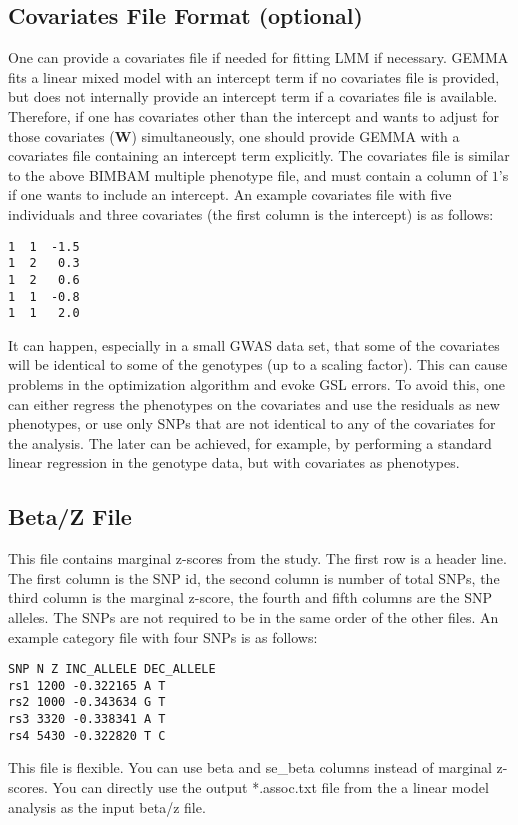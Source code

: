 \documentclass[11pt]{article}
\begin{document}
\subsection{Covariates File Format (optional)}

One can provide a covariates file if needed for fitting LMM if
necessary. GEMMA fits a linear mixed model with an intercept term if
no covariates file is provided, but does not internally provide an
intercept term if a covariates file is available. Therefore, if one
has covariates other than the intercept and wants to adjust for those
covariates ($\mathbf W$) simultaneously, one should provide GEMMA with
a covariates file containing an intercept term explicitly. The
covariates file is similar to the above BIMBAM multiple phenotype
file, and must contain a column of $1$'s if one wants to include an
intercept. An example covariates file with five individuals and three
covariates (the first column is the intercept) is as follows:
%
\begin{verbatim}
1  1  -1.5
1  2   0.3
1  2   0.6
1  1  -0.8
1  1   2.0
\end{verbatim}
%
It can happen, especially in a small GWAS data set, that some of the
covariates will be identical to some of the genotypes (up to a scaling
factor). This can cause problems in the optimization algorithm and
evoke GSL errors. To avoid this, one can either regress the phenotypes
on the covariates and use the residuals as new phenotypes, or use only
SNPs that are not identical to any of the covariates for the
analysis. The later can be achieved, for example, by performing a
standard linear regression in the genotype data, but with covariates
as phenotypes.

\subsection{Beta/Z File}

This file contains marginal z-scores from the study. The first row is
a header line. The first column is the SNP id, the second column is
number of total SNPs, the third column is the marginal z-score, the
fourth and fifth columns are the SNP alleles. The SNPs are not
required to be in the same order of the other files. An example
category file with four SNPs is as follows:
%
\begin{verbatim}
SNP N Z INC_ALLELE DEC_ALLELE
rs1 1200 -0.322165 A T
rs2 1000 -0.343634 G T
rs3 3320 -0.338341 A T
rs4 5430 -0.322820 T C
\end{verbatim}
%
This file is flexible. You can use beta and se\_beta columns instead
of marginal z-scores. You can directly use the output *.assoc.txt file
from the a linear model analysis as the input beta/z file.
\end{document}
